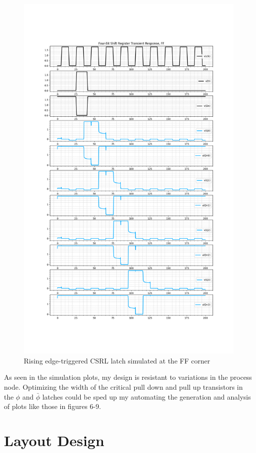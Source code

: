 \documentclass[11pt]{article}
\begin{document}
\begin{figure}[H]
  \centering
  \includegraphics[width=13cm]{media/csrl_rising_edge_x4_ff.png}
  \caption{Rising edge-triggered CSRL latch simulated at the FF corner}
\end{figure}

As seen in the simulation plots, my design is resistant to variations in the process node. Optimizing the width of the critical pull down and pull up transistors in the $\phi$ and $\bar\phi$ latches could be sped up my automating the generation and analysis of plots like those in figures 6-9.

\section*{Layout Design}
\end{document}
